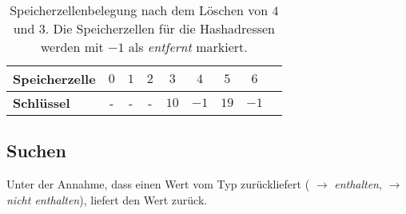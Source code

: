 {\renewcommand{\arraystretch}{2.5}%
\setlength{\tabcolsep}{12pt}%
\begin{table} %
    \begin{center}
        \begin{tabular}{|l | c | c |c |c | c | c| c|}
            \hline
            \textbf{Speicherzelle} & $0$ & $1$ & $2$ & $3$ & $4$ & $5$ & $6$ \\
            \hline
            \textbf{Schlüssel} &  - & - & - & $10$ & $-1$ & $19$ & $-1$ &
            \hline
        \end{tabular}
        \caption{Speicherzellenbelegung nach dem Löschen von $4$ und $3$. Die Speicherzellen für die Hashadressen werden mit $-1$ als \textit{entfernt} markiert.}
        \label{tab:hashdel}
    \end{center}
\end{table}}

\subsection*{Suchen}

Unter der Annahme, dass  einen Wert vom Typ  zurückliefert ( $\rightarrow$ \textit{enthalten},  $\rightarrow$ \textit{nicht enthalten}), liefert
 den Wert  zurück.